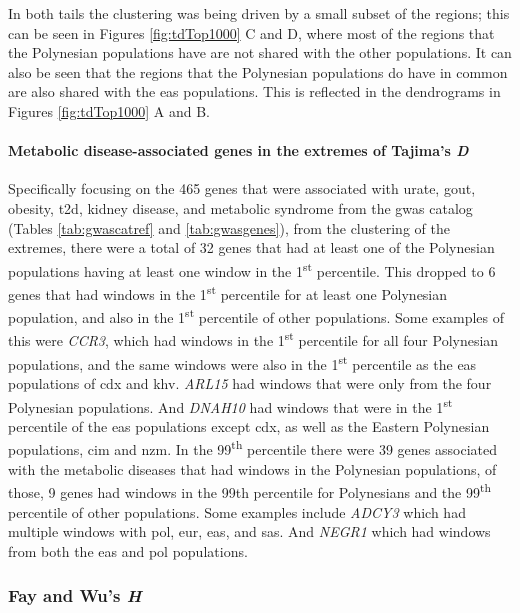 \documentclass[twoside,openright]{report}
\let\oldparagraph\paragraph
\renewcommand{\paragraph}[1]{\oldparagraph{#1}\mbox{}}
\begin{document}
In both tails the clustering was being driven by a small subset of the
regions; this can be seen in Figures \ref{fig:tdTop1000} C and D, where
most of the regions that the Polynesian populations have are not shared
with the other populations. It can also be seen that the regions that
the Polynesian populations do have in common are also shared with the
\gls{eas} populations. This is reflected in the dendrograms in Figures
\ref{fig:tdTop1000} A and B.

\paragraph{\texorpdfstring{Metabolic disease-associated genes in the
extremes of Tajima's
\emph{D}}{Metabolic disease-associated genes in the extremes of Tajima's D}}\label{metabolic-disease-associated-genes-in-the-extremes-of-tajimas-d}

Specifically focusing on the 465 genes that were associated with urate,
gout, obesity, \gls{t2d}, kidney disease, and metabolic syndrome from
the \gls{gwas} catalog (Tables \ref{tab:gwascatref} and
\ref{tab:gwasgenes}), from the clustering of the extremes, there were a
total of 32 genes that had at least one of the Polynesian populations
having at least one window in the 1\textsuperscript{st} percentile. This
dropped to 6 genes that had windows in the 1\textsuperscript{st}
percentile for at least one Polynesian population, and also in the
1\textsuperscript{st} percentile of other populations. Some examples of
this were \emph{CCR3}, which had windows in the 1\textsuperscript{st}
percentile for all four Polynesian populations, and the same windows
were also in the 1\textsuperscript{st} percentile as the \gls{eas}
populations of \gls{cdx} and \gls{khv}. \emph{ARL15} had windows that
were only from the four Polynesian populations. And \emph{DNAH10} had
windows that were in the 1\textsuperscript{st} percentile of the
\gls{eas} populations except \gls{cdx}, as well as the Eastern
Polynesian populations, \gls{cim} and \gls{nzm}. In the
99\textsuperscript{th} percentile there were 39 genes associated with
the metabolic diseases that had windows in the Polynesian populations,
of those, 9 genes had windows in the 99th percentile for Polynesians and
the 99\textsuperscript{th} percentile of other populations. Some
examples include \emph{ADCY3} which had multiple windows with \gls{pol},
\gls{eur}, \gls{eas}, and \gls{sas}. And \emph{NEGR1} which had windows
from both the \gls{eas} and \gls{pol} populations.

\subsubsection{\texorpdfstring{Fay and Wu's
\emph{H}}{Fay and Wu's H}}\label{fay-and-wus-h-1}
\end{document}
